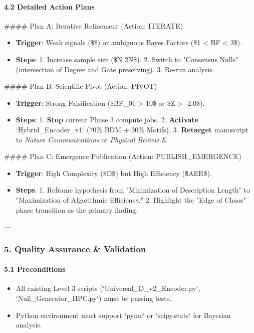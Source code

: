 \documentclass{article}
\begin{document}
\paragraph{4.2 Detailed Action Plans}

\#\#\#\# Plan A: Iterative Refinement (Action: ITERATE)
\begin{itemize}
\item   \textbf{Trigger}: Weak signals (\$\rho {}\$) or ambiguous Bayes Factors (\$1 < BF < 3\$).
\item   \textbf{Steps}:
    1.  Increase sample size (\$N \to 2N\$).
    2.  Switch to "Consensus Nulls" (intersection of Degree and Gate preserving).
    3.  Re-run analysis.
\end{itemize}

\#\#\#\# Plan B: Scientific Pivot (Action: PIVOT)
\begin{itemize}
\item   \textbf{Trigger}: Strong Falsification (\$BF\_{01} > 10\$ or \$Z > -2.0\$).
\item   \textbf{Steps}:
    1.  \textbf{Stop} current Phase 3 compute jobs.
    2.  \textbf{Activate} `Hybrid\_Encoder\_v1` (70\% BDM + 30\% Motifs).
    3.  \textbf{Retarget} manuscript to \textit{Nature Communications} or \textit{Physical Review E}.
\end{itemize}

\#\#\#\# Plan C: Emergence Publication (Action: PUBLISH\_EMERGENCE)
\begin{itemize}
\item   \textbf{Trigger}: High Complexity (\$D\$) but High Efficiency (\$AER\$).
\item   \textbf{Steps}:
    1.  Reframe hypothesis from "Minimization of Description Length" to "Maximization of Algorithmic Efficiency."
    2.  Highlight the "Edge of Chaos" phase transition as the primary finding.
\end{itemize}

---

\subsubsection{5. Quality Assurance \& Validation}

\paragraph{5.1 Preconditions}
\begin{itemize}
\item   All existing Level 3 scripts (`Universal\_D\_v2\_Encoder.py`, `Null\_Generator\_HPC.py`) must be passing tests.
\item   Python environment must support `pymc` or `scipy.stats` for Bayesian analysis.
\end{itemize}
\end{document}
